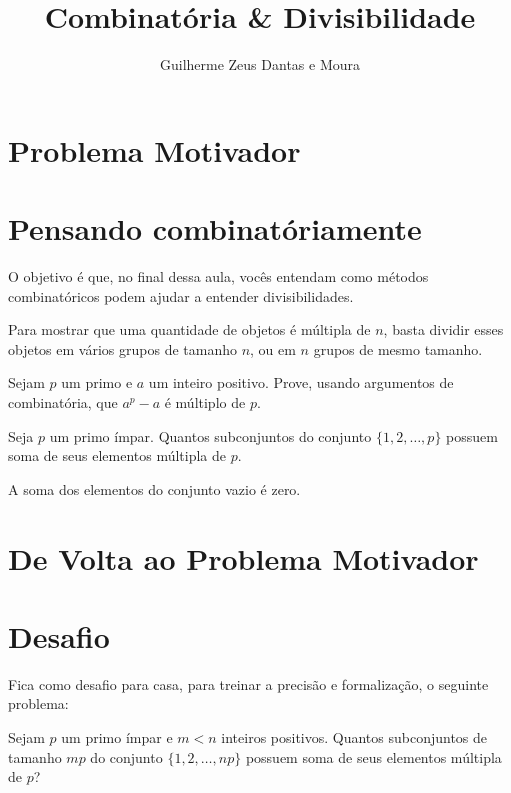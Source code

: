 \documentclass[11pt, a4paper]{article}
\title{Combinatória \& Divisibilidade}
\author{Guilherme Zeus Dantas e Moura}
\begin{document}
	
	\zeustitle

	\section{Problema Motivador}


	\section{Pensando combinatóriamente}

	O objetivo é que, no final dessa aula, vocês entendam como métodos combinatóricos podem ajudar a entender divisibilidades.

	\begin{idea}
		Para mostrar que uma quantidade de objetos é múltipla de $n$, basta dividir esses objetos em vários grupos de tamanho $n$, ou em $n$ grupos de mesmo tamanho. 
	\end{idea}

	\begin{prob}
		Sejam $p$ um primo e $a$ um inteiro positivo. Prove, usando argumentos de combinatória, que $a^p - a$ é múltiplo de $p$. 
	\end{prob}

	\begin{prob}
		Seja $p$ um primo ímpar. Quantos subconjuntos do conjunto $\{1, 2, \dots, p\}$ possuem soma de seus elementos múltipla de $p$.
	\end{prob}
	\begin{rem}
		A soma dos elementos do conjunto vazio é zero.
	\end{rem}

	\section{De Volta ao Problema Motivador}

	\setcounter{prob}{0}
	\setcounter{prob}{3}

	\section{Desafio}
	
	Fica como desafio para casa, para treinar a precisão e formalização, o seguinte problema:

	\begin{prob}
		Sejam $p$ um primo ímpar e $m < n$ inteiros positivos. Quantos subconjuntos de tamanho $mp$ do conjunto $\{1, 2, \dots, np\}$ possuem soma de seus elementos múltipla de $p$?
	\end{prob}
\end{document}
